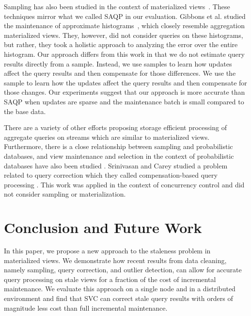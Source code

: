 Sampling has also been studied in the context of materialized views~\cite{joshi2008materialized,DBLP:conf/icde/OlkenR92}.
These techniques mirror what we called SAQP in our evaluation.
Gibbons et al. studied the maintenance of approximate histograms~\cite{gibbons1997fast}, which closely resemble aggregation materialized views.
They, however, did not consider queries on these histograms, but rather, they took a holistic approach to analyzing the error over the entire histogram.
Our approach differs from this work in that we do not estimate query results directly from a sample. Instead, we use samples to learn how updates affect the query results and then compensate for those differences. 
We use the sample to learn how the updates affect the query results and then compensate for those changes.
Our experiments suggest that our approach is more accurate than SAQP when updates are sparse and the maintenance batch is small compared to the base data.

There are a variety of other efforts proposing storage efficient processing of aggregate queries on streams \cite{dobra2002processing, greenwald2001space} which are similar to materialized views. Furthermore, there is a close relationship between sampling and probabilistic databases, and view maintenance and selection in the context of probabilistic databases have also been studied \cite{re2007materialized}.
Srinivasan and Carey studied a problem related to query correction which they called compensation-based query processing \cite{srinivasanC92}.
This work was applied in the context of concurrency control and did not consider sampling or materialization.

\section{Conclusion and Future Work}\label{conclusion}

In this paper, we propose a new approach to the staleness problem in materialized views.
We demonstrate how recent results from data cleaning, namely sampling, query correction, and outlier detection, can
allow for accurate query processing on stale views for a fraction of the cost of incremental maintenance. 
We evaluate this approach on a single node and in a distributed environment and find that SVC can correct stale query results 
with orders of magnitude less cost than full incremental maintenance.

